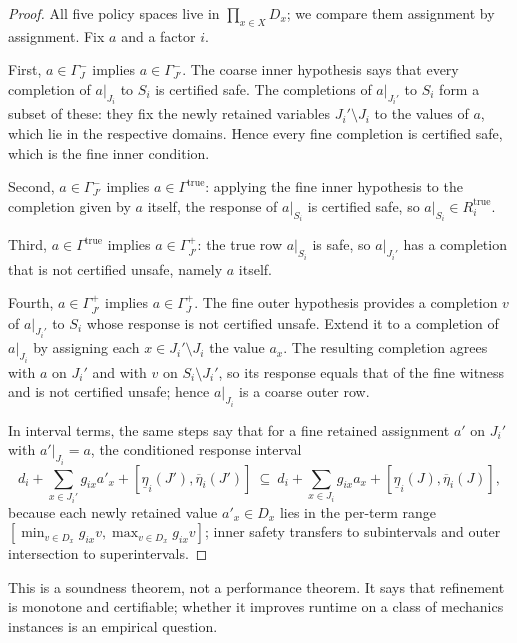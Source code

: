 \documentclass[11pt]{article}
\theoremstyle{plain}
\theoremstyle{definition}
\theoremstyle{remark}
\begin{document}
\begin{proof}
All five policy spaces live in \(\prod_{x\in X}D_x\); we compare them
assignment by assignment.  Fix \(a\) and a factor \(i\).

First, \(a\in\Gamma^-_J\) implies \(a\in\Gamma^-_{J'}\).  The coarse inner
hypothesis says that every completion of \(a|_{J_i}\) to \(S_i\) is
certified safe.  The completions of \(a|_{J_i'}\) to \(S_i\) form a subset
of these: they fix the newly retained variables \(J_i'\setminus J_i\) to
the values of \(a\), which lie in the respective domains.  Hence every fine
completion is certified safe, which is the fine inner condition.

Second, \(a\in\Gamma^-_{J'}\) implies \(a\in\Gamma^{\mathrm{true}}\):
applying the fine inner hypothesis to the completion given by \(a\) itself,
the response of \(a|_{S_i}\) is certified safe, so \(a|_{S_i}\in
R_i^{\mathrm{true}}\).

Third, \(a\in\Gamma^{\mathrm{true}}\) implies \(a\in\Gamma^+_{J'}\): the
true row \(a|_{S_i}\) is safe, so \(a|_{J_i'}\) has a completion that is
not certified unsafe, namely \(a\) itself.

Fourth, \(a\in\Gamma^+_{J'}\) implies \(a\in\Gamma^+_J\).  The fine
outer hypothesis provides a completion \(v\) of \(a|_{J_i'}\) to \(S_i\)
whose response is not certified unsafe.  Extend it to a completion of
\(a|_{J_i}\) by assigning each \(x\in J_i'\setminus J_i\) the value
\(a_x\).  The resulting completion agrees with \(a\) on \(J_i'\) and with
\(v\) on \(S_i\setminus J_i'\), so its response equals that of the fine
witness and is not certified unsafe; hence \(a|_{J_i}\) is a coarse outer
row.

In interval terms, the same steps say that for a fine retained assignment
\(a'\) on \(J_i'\) with \(a'|_{J_i}=a\), the conditioned response interval
\[
  d_i+\sum_{x\in J_i'}g_{ix}a'_x+
  [\underline\eta_i(J'),\overline\eta_i(J')]
  \ \subseteq\ 
  d_i+\sum_{x\in J_i}g_{ix}a_x+
  [\underline\eta_i(J),\overline\eta_i(J)],
\]
because each newly retained value \(a'_x\in D_x\) lies in the per-term
range \([\min_{v\in D_x}g_{ix}v,\max_{v\in D_x}g_{ix}v]\); inner safety
transfers to subintervals and outer intersection to superintervals.
\end{proof}

This is a soundness theorem, not a performance theorem.  It says that refinement
is monotone and certifiable; whether it improves runtime on a class of mechanics
instances is an empirical question.
\end{document}
